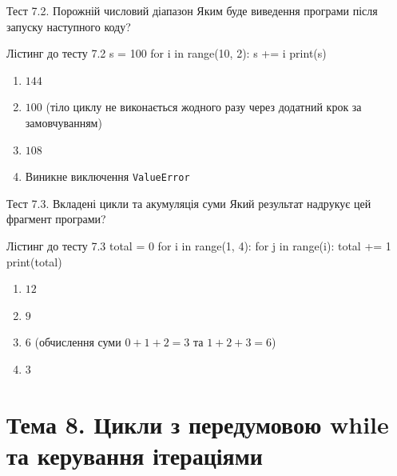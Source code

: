 \begin{pr}{Тест 7.2. Порожній числовий діапазон}
Яким буде виведення програми після запуску наступного коду?
\begin{py}{Лістинг до тесту 7.2}
s = 100
for i in range(10, 2):
    s += i
print(s)
\end{py}
\begin{enumerate}[label=\textbf{\Alph*.}]
	\item $144$
	\item $100$ (тіло циклу не виконається жодного разу через додатний крок за замовчуванням)
	\item $108$
	\item Виникне виключення \texttt{ValueError}
\end{enumerate}
\end{pr}

\begin{pr}{Тест 7.3. Вкладені цикли та акумуляція суми}
Який результат надрукує цей фрагмент програми?
\begin{py}{Лістинг до тесту 7.3}
total = 0
for i in range(1, 4):
    for j in range(i):
        total += 1
print(total)
\end{py}
\begin{enumerate}[label=\textbf{\Alph*.}]
	\item $12$
	\item $9$
	\item $6$ (обчислення суми $0 + 1 + 2 = 3$ та $1+2+3 = 6$)
	\item $3$
\end{enumerate}
\end{pr}

\section{Тема 8. Цикли з передумовою while та керування ітераціями}


